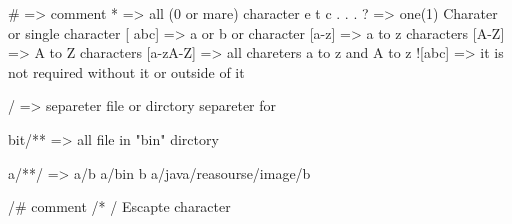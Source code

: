 # => comment
* =>  all (0 or mare) character e t c . . .
? =>  one(1) Charater or single character
[ abc] => a or b or character
[a-z] => a to z characters
[A-Z] => A to Z  characters
[a-zA-Z]  => all chareters a to z and A to z
![abc] => it is not required without it or outside of it

/  => separeter file or dirctory separeter for 

bit/** => all file  in "bin"  dirctory

a/**/  => a/b  a/bin b a/java/reasourse/image/b 

 /# comment
 /* / Escapte character